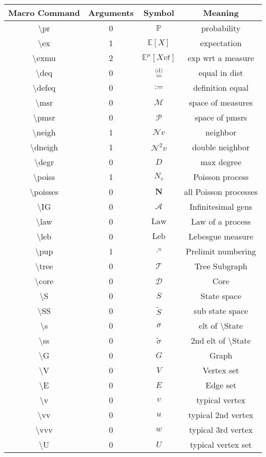 \documentclass[12pt]{article}
\newcommand{\mb}{\mathbb}
\newcommand{\mc}{\mathcal}
\newcommand{\te}{\text}
\newcommand{\tbs}{\textbackslash}
\newcommand{\pr}{\mb{P}}							%
\newcommand{\ex}[1]{\mb{E}\left[#1\right]}			%
\newcommand{\exmu}[2]{\mb{E}^{#1}\left[#2\right]}	%
\newcommand{\deq}{\overset{\text{(d)}}{=}}			%
\newcommand{\defeq}{:=}								%
\newcommand{\msr}{\mc{M}}							%
\newcommand{\pmsr}{\mc{P}}							%
\newcommand{\neigh}{\mc{N}}					%
\newcommand{\dneigh}{\mc{N}^2}				%
\renewcommand{\v}{v}							%
\newcommand{\vv}{u}								%
\newcommand{\vvv}{w}							%
\renewcommand{\U}{U}							%
\renewcommand{\S}{S}							%
\newcommand{\s}{\sigma}							%
\renewcommand{\t}{t}							%
\newcommand{\X}{X}								%
\newcommand{\IG}{\mc{A}}						%
\renewcommand{\ss}[1]{^{#1}}					%
\newcommand{\degr}{D}								%
\newcommand{\poiss}[1]{N_{#1}}						%
\newcommand{\poisses}{\mathbf{N}}				%
\newcommand{\law}{\te{Law}}							%
\newcommand{\leb}{\te{Leb}}							%
\newcommand{\pup}[1]{^{#1}}							%
\newcommand{\tree}{\mc{T}}							%
\newcommand{\core}{\mc{D}}							%
\renewcommand{\SS}{\tilde{\S}}						%
\renewcommand{\ss}{\tilde{\s}}					%
\renewcommand{\G}{G}								%
\newcommand{\V}{V}									%
\newcommand{\E}{E}									%
\newcommand{\m}[3]{\mu_{#2#1}^{#3}}						%
\begin{document}
\begin{longtable}{c|c|c|c}
Macro Command & Arguments & Symbol & Meaning\\\hline
\tbs pr&0&\(\pr\)	& probability\\
\tbs ex&1&\(\ex{X}\)	&expectation\\
\tbs exmu&2&\(\exmu{\m{}{}{}}{\X{\v}{\t}}\)	&exp wrt a measure\\
\tbs deq&0&\(\deq\)		&equal in dist\\
\tbs defeq&0&\(\defeq\)							&definition equal\\
\tbs msr&0&\(\msr\)							&space of measures\\
\tbs pmsr&0&\(\pmsr\)						&space of pmsrs\\
\tbs neigh&1&\(\neigh{\v}\)				&neighbor\\
\tbs dneigh&1&\(\dneigh{\v}\)				&double neighbor\\
\tbs degr&0&\(\degr\)								&max degree\\
\tbs poiss&1&\(\poiss{\v}\)						&Poisson process\\
\tbs poisses&0&\(\poisses\)					&all Poisson processes\\
\tbs IG&0&\(\IG\)					&Infinitesimal gens\\
\tbs law&0&\(\law\)							&Law of a process\\
\tbs leb&0&\(\leb\)							&Lebesgue measure\\
\tbs pup&1&\(\cdot\pup{n}\)						&Prelimit numbering\\
\tbs tree&0&\(\tree\)							&Tree Subgraph\\
\tbs core&0&\(\core\)							&Core\\
\tbs S&0&\(\S\)							&State space\\
\tbs SS&0&\(\SS\)						&sub state space\\
\tbs s&0&\(\s\)								&elt of \tbs State\\
\tbs ss&0&\(\ss\)						&2nd elt of \tbs State\\
\tbs G&0&\(\G\)								&Graph\\
\tbs V&0&\(\V\)									&Vertex set\\
\tbs E&0&\(\E\)									&Edge set\\
\tbs v&0&\(\v\)								&typical vertex\\
\tbs vv&0&\(\vv\)									&typical 2nd vertex\\
\tbs vvv&0&\(\vvv\)								&typical 3rd vertex\\
\tbs U&0&\(\U\)									&typical vertex set\\

\end{longtable}
\end{document}
